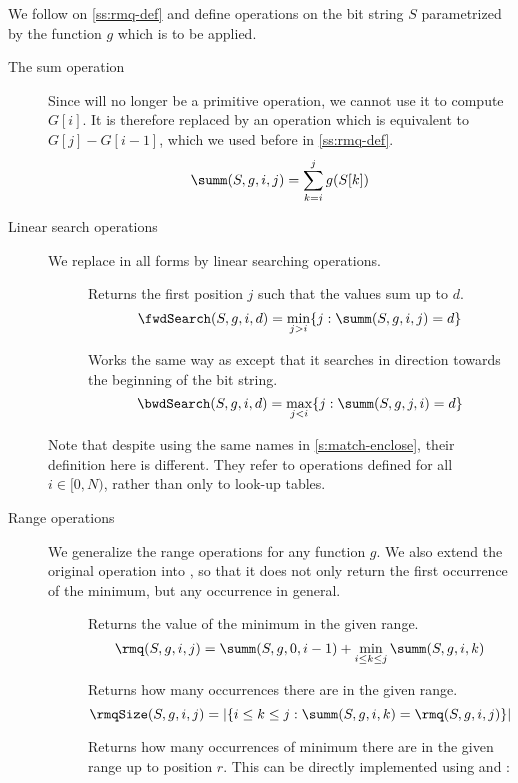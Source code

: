 We follow on \ref{ss:rmq-def} and define operations on the bit string $S$ parametrized by the function $g$ which is to be applied.
\begin{description}
	\item[The sum operation]
	Since \rank{} will no longer be a primitive operation, we cannot use it to compute $G[i]$.
	It is therefore replaced by an operation \summ{} which is equivalent to $G[j] - G[i - 1]$, which we used before in \ref{ss:rmq-def}.
	$$\summ(S, g, i, j) = \sum_{k=i}^j g(S[k])$$
	
	\item[Linear search operations]
	We replace \select{} in all forms by linear searching operations.
	\begin{description}
		\item[\fwdSearch{}]
		Returns the first position $j$ such that the values sum up to $d$.
		$$\fwdSearch(S, g, i, d) = \min_{j > i} \{j : \summ(S, g, i, j) = d\}$$
		
		\item[\bwdSearch{}]
		Works the same way as \fwdSearch{} except that it searches in direction towards the beginning of the bit string.
		$$\bwdSearch(S, g, i, d) = \max_{j < i} \{j : \summ(S, g, j, i) = d\}$$
	\end{description}
	
	Note that despite using the same names in \ref{s:match-enclose}, their definition here is different.
	They refer to operations defined for all $i \in [0, N)$, rather than only to look-up tables. 
	
	\item[Range operations]
	We generalize the range operations for any function $g$.
	We also extend the original operation \rmqi{} into \rmqSelect{}, so that it does not only return the first occurrence of the minimum, but any occurrence in general.
	
	\begin{description}
		\item[\rmq{}]
		Returns the value of the minimum in the given range.
		$$\rmq(S, g, i, j) = \summ(S, g, 0, i - 1) + \min_{i \le k \le j} \summ(S, g, i, k)$$

		\item[\rmqSize{}]
		Returns how many occurrences there are in the given range.
		$$\rmqSize(S, g, i, j) = | \{ i \le k \le j : \summ(S, g, i, k) = \rmq(S, g, i, j) \} | $$
		
		\item[\rmqRank{}]
		Returns how many occurrences of minimum there are in the given range up to position $r$.
		This can be directly implemented using \rmq{} and \rmqSize{}:
		\begin{algorithmic}
					\State {}
				\Else
					\State {}
				\EndIf
			\EndFunction
		\end{algorithmic}
		

\end{description}
\end{description}
